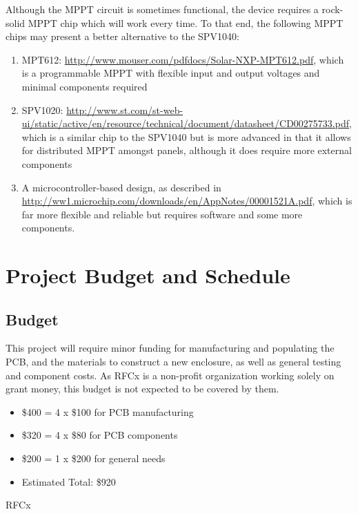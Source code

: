 \documentclass{article}
\numberwithin{figure}{section}
\numberwithin{equation}{section}
\begin{document}
{Although the MPPT circuit is sometimes functional, the device requires a rock-solid MPPT chip which will work every time. To that end, the following MPPT chips may present a better alternative to the SPV1040:
\begin{enumerate}
    \item MPT612: \href{http://www.mouser.com/pdfdocs/Solar-NXP-MPT612.pdf}{http://www.mouser.com/pdfdocs/Solar-NXP-MPT612.pdf}, which is a programmable MPPT with flexible input and output voltages and minimal components required
    \item SPV1020: \href{http://www.st.com/st-web-ui/static/active/en/resource/technical/document/datasheet/CD00275733.pdf}{http://www.st.com/st-web-ui/static/active/en/resource/technical/document/datasheet/CD00275733.pdf}, which is a similar chip to the SPV1040 but is more advanced in that it allows for distributed MPPT amongst panels, although it does require more external components
    \item A microcontroller-based design, as described in \href{http://ww1.microchip.com/downloads/en/AppNotes/00001521A.pdf}{http://ww1.microchip.com/downloads/en/AppNotes/00001521A.pdf}, which is far more flexible and reliable but requires software and some more components.
\end{enumerate}

\section{Project Budget and Schedule} \label{sect:budgetandschedule}
\subsection{Budget} \label{sect:budget}
This project will require minor funding for manufacturing and populating the PCB, and the materials to construct a new enclosure, as well as general testing and component costs. As RFCx is a non-profit organization working solely on grant money, this budget is not expected to be covered by them.
\begin{itemize}
\item \$400 = 4 x \$100 for PCB manufacturing
\item \$320 = 4 x \$80 for PCB components
\item \$200 = 1 x \$200 for general needs
\item Estimated Total: \$920
\end{itemize}

RFCx

}
\end{document}
